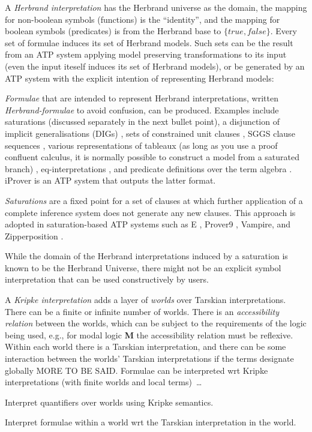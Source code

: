 \documentclass{easychair}
\newenvironment{packed_itemize}{
\vspace*{-0.3em}
\begin{itemize}
\setlength{\partopsep}{0pt}
\setlength{\itemsep}{1pt}
\setlength{\parskip}{0pt}
\setlength{\parsep}{0pt}
}{\end{itemize}}
\begin{document}
\vspace*{0.8em}
A {\em Herbrand interpretation} \cite{Her30} has the Herbrand universe as the domain, the mapping 
for non-boolean symbols (functions) is the ``identity'', and the mapping for boolean symbols 
(predicates) is from the Herbrand base to $\{true,false\}$.
Every set of formulae induces its set of Herbrand models.
Such sets can be the result from an ATP system applying model preserving transformations to its 
input (even the input iteself induces its set of Herbrand models), or be generated by an ATP 
system with the explicit intention of representing Herbrand models:
\begin{packed_itemize}
\item {\em Formulae} that are intended to represent Herbrand interpretations, written 
      {\em Herbrand-formulae} to avoid confusion, can be produced.
      Examples include saturations (discussed separately in the next bullet point), a disjunction 
      of implicit generalisations (DIGs) \cite{LM87}, sets of constrained unit clauses 
      \cite{CZ92,CP95,CP95-TAB}, SGGS clause sequences \cite{BP16}, various representations of 
      tableaux (as long as you use a proof confluent calculus, it is normally possible to construct 
      a model from a saturated branch) \cite{Hah01}, eq-interpretations \cite{Pel03-EQMC}, and 
      predicate definitions over the term algebra \cite{SK12}.
      iProver \cite{Kor08,SK12} is an ATP system that outputs the latter format.
\item {\em Saturations} \cite{BG+01,Pel03-JSC} are a fixed point for a set of clauses at which 
      further application of a complete inference system does not generate any new clauses.
      This approach is adopted in saturation-based ATP systems such as E \cite{SCV19},
      Prover9 \cite{McC-Prover9-URL}, Vampire, and Zipperposition \cite{VB+21}.
\end{packed_itemize}
While the domain of the Herbrand interpretations induced by a saturation is known to be the 
Herbrand Universe, there might not be an explicit symbol interpretation that can be used 
constructively by users.

A {\em Kripke interpretation} \cite{Kri63} adds a layer of {\em worlds} over Tarskian 
interpretations.
There can be a finite or infinite number of worlds.
There is an {\em accessibility relation} between the worlds, which can be subject to the
requirements of the logic being used, e.g., for modal logic {\bf M} the accessibility 
relation must be reflexive.
Within each world there is a Tarskian interpretation, and there can be some interaction
between the worlds' Tarskian interpretations if the terms designate globally MORE TO BE SAID.
Formulae can be interpreted wrt Kripke interpretations (with finite worlds and local terms)~\ldots
\begin{packed_itemize}
\item Interpret quantifiers over worlds using Kripke semantics.
\item Interpret formulae within a world wrt the Tarskian interpretation in the world.
\end{packed_itemize}
\end{document}
